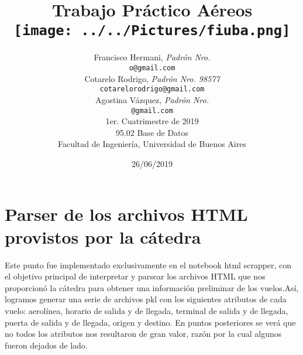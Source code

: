 \documentclass[a4paper,11pt]{article}
\title{\textbf{Trabajo Práctico Aéreos} \\[1cm] \texttt{[image: ../../Pictures/fiuba.png]}}
\author{	Francisco Hermani, \textit{Padrón Nro. }                     \\
            \texttt{ o@gmail.com }                                              \\[2.5ex]
            Cotarelo Rodrigo, \textit{Padrón Nro. 98577}                     \\
            \texttt{ cotarelorodrigo@gmail.com }                                              \\[2.5ex]
			Agostina Vázquez, \textit{Padrón Nro. }                    
\\
            \texttt{ @gmail.com }                                              \\[2.5ex]
            \normalsize{1er. Cuatrimestre de 2019}                                      \\
            \normalsize{95.02 Base de Datos}  \\
            \normalsize{Facultad de Ingeniería, Universidad de Buenos Aires}            \\
       }
\date{26/06/2019}
\begin{document}
\maketitle
\thispagestyle{empty}   %
\newpage

\section{Parser de los archivos HTML provistos por la cátedra}
Este punto fue implementado exclusivamente en el notebook html scrapper, con el objetivo principal de interpretar y parsear los archivos HTML que nos proporcionó la cátedra para obtener una información preliminar de los vuelos.Así, logramos generar una serie de archivos pkl con los siguientes atributos de cada vuelo: aerolínea, horario de salida y de llegada, terminal de salida y de llegada, puerta de salida y de llegada, origen y destino. En puntos posteriores se verá que no todos los atributos nos resultaron de gran valor, razón por la cual algunos fueron dejados de lado.
\end{document}
